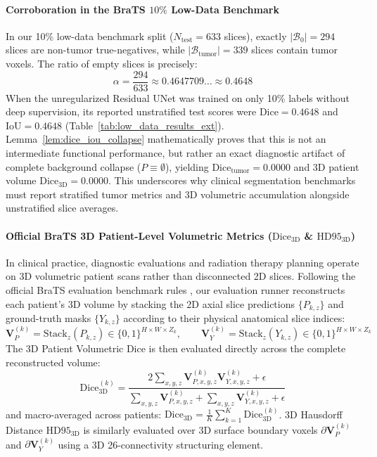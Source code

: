 \documentclass{article}
\begin{document}
\paragraph{Corroboration in the BraTS $10\%$ Low-Data Benchmark}
In our 10\% low-data benchmark split ($N_{\text{test}} = 633$ slices), exactly $|\mathcal{B}_0| = 294$ slices are non-tumor true-negatives, while $|\mathcal{B}_{\text{tumor}}| = 339$ slices contain tumor voxels. The ratio of empty slices is precisely:
\begin{equation}
    \alpha = \frac{294}{633} \approx 0.4647709 \dots \approx \mathbf{0.4648}
\end{equation}
When the unregularized Residual UNet was trained on only 10\% labels without deep supervision, its reported unstratified test scores were $\text{Dice} = 0.4648$ and $\text{IoU} = 0.4648$ (Table~\ref{tab:low_data_results_ext}). Lemma~\ref{lem:dice_iou_collapse} mathematically proves that this is not an intermediate functional performance, but rather an exact diagnostic artifact of complete background collapse ($P \equiv \emptyset$), yielding $\text{Dice}_{\text{tumor}} = 0.0000$ and 3D patient volume $\text{Dice}_{\text{3D}} = 0.0000$. This underscores why clinical segmentation benchmarks must report stratified tumor metrics and 3D volumetric accumulation alongside unstratified slice averages.

\paragraph{Official BraTS 3D Patient-Level Volumetric Metrics ($\text{Dice}_{\text{3D}}$ \& $\text{HD95}_{\text{3D}}$)}
In clinical practice, diagnostic evaluations and radiation therapy planning operate on 3D volumetric patient scans rather than disconnected 2D slices. Following the official BraTS evaluation benchmark rules \citep{brats2024}, our evaluation runner reconstructs each patient's 3D volume by stacking the 2D axial slice predictions $\{P_{k, z}\}$ and ground-truth masks $\{Y_{k, z}\}$ according to their physical anatomical slice indices:
\begin{equation}
    \mathbf{V}_P^{(k)} = \text{Stack}_{z}\left( P_{k, z} \right) \in \{0, 1\}^{H \times W \times Z_k}, \qquad \mathbf{V}_Y^{(k)} = \text{Stack}_{z}\left( Y_{k, z} \right) \in \{0, 1\}^{H \times W \times Z_k}
\end{equation}
The 3D Patient Volumetric Dice is then evaluated directly across the complete reconstructed volume:
\begin{equation}
    \text{Dice}_{\text{3D}}^{(k)} = \frac{2 \sum_{x,y,z} \mathbf{V}_{P, x,y,z}^{(k)} \mathbf{V}_{Y, x,y,z}^{(k)} + \epsilon}{\sum_{x,y,z} \mathbf{V}_{P, x,y,z}^{(k)} + \sum_{x,y,z} \mathbf{V}_{Y, x,y,z}^{(k)} + \epsilon}
\end{equation}
and macro-averaged across patients: $\text{Dice}_{\text{3D}} = \frac{1}{K} \sum_{k=1}^K \text{Dice}_{\text{3D}}^{(k)}$. 3D Hausdorff Distance $\text{HD95}_{\text{3D}}$ is similarly evaluated over 3D surface boundary voxels $\partial \mathbf{V}_P^{(k)}$ and $\partial \mathbf{V}_Y^{(k)}$ using a 3D 26-connectivity structuring element.
\end{document}
